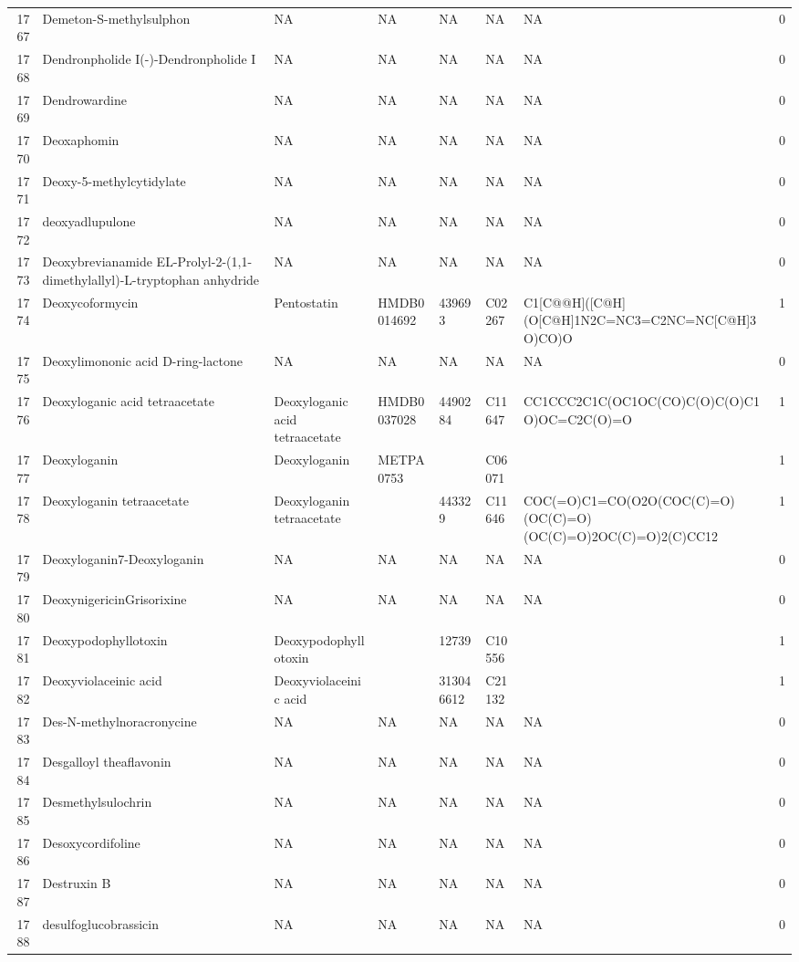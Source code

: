 \documentclass[a4paper]{article}
\begin{document}
\begin{longtable}{rlllllll}
  1767 & Demeton-S-methylsulphon & NA & NA & NA & NA & NA & 0 \\ 
  1768 & Dendronpholide I(-)-Dendronpholide I & NA & NA & NA & NA & NA & 0 \\ 
  1769 & Dendrowardine & NA & NA & NA & NA & NA & 0 \\ 
  1770 & Deoxaphomin & NA & NA & NA & NA & NA & 0 \\ 
  1771 & Deoxy-5-methylcytidylate & NA & NA & NA & NA & NA & 0 \\ 
  1772 & deoxyadlupulone & NA & NA & NA & NA & NA & 0 \\ 
  1773 & Deoxybrevianamide EL-Prolyl-2-(1,1-dimethylallyl)-L-tryptophan anhydride & NA & NA & NA & NA & NA & 0 \\ 
  1774 & Deoxycoformycin & Pentostatin & HMDB0014692 & 439693 & C02267 & C1[C@@H]([C@H](O[C@H]1N2C=NC3=C2NC=NC[C@H]3O)CO)O & 1 \\ 
  1775 & Deoxylimononic acid D-ring-lactone & NA & NA & NA & NA & NA & 0 \\ 
  1776 & Deoxyloganic acid tetraacetate & Deoxyloganic acid tetraacetate & HMDB0037028 & 4490284 & C11647 & CC1CCC2C1C(OC1OC(CO)C(O)C(O)C1O)OC=C2C(O)=O & 1 \\ 
  1777 & Deoxyloganin & Deoxyloganin & METPA0753 &  & C06071 &  & 1 \\ 
  1778 & Deoxyloganin tetraacetate & Deoxyloganin tetraacetate &  & 443329 & C11646 & COC(=O)C1=CO(O2O(COC(C)=O)(OC(C)=O)(OC(C)=O)2OC(C)=O)2(C)CC12 & 1 \\ 
  1779 & Deoxyloganin7-Deoxyloganin & NA & NA & NA & NA & NA & 0 \\ 
  1780 & DeoxynigericinGrisorixine & NA & NA & NA & NA & NA & 0 \\ 
  1781 & Deoxypodophyllotoxin & Deoxypodophyllotoxin &  & 12739 & C10556 &  & 1 \\ 
  1782 & Deoxyviolaceinic acid & Deoxyviolaceinic acid &  & 313046612 & C21132 &  & 1 \\ 
  1783 & Des-N-methylnoracronycine & NA & NA & NA & NA & NA & 0 \\ 
  1784 & Desgalloyl theaflavonin & NA & NA & NA & NA & NA & 0 \\ 
  1785 & Desmethylsulochrin & NA & NA & NA & NA & NA & 0 \\ 
  1786 & Desoxycordifoline & NA & NA & NA & NA & NA & 0 \\ 
  1787 & Destruxin B & NA & NA & NA & NA & NA & 0 \\ 
  1788 & desulfoglucobrassicin & NA & NA & NA & NA & NA & 0 \\ 

\end{longtable}
\end{document}

